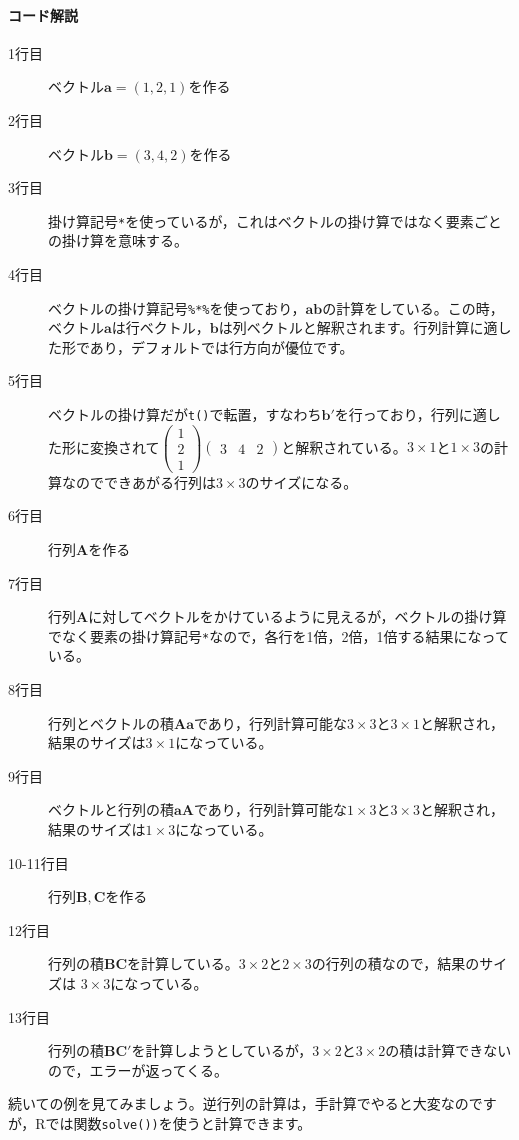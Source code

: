\documentclass{ltjsbook}
\begin{document}
\paragraph{コード解説}
\begin{description}
	\item[1行目] ベクトル$\bm{a}=(1,2,1)$を作る
	\item[2行目] ベクトル$\bm{b}=(3,4,2)$を作る
	\item[3行目] 掛け算記号\verb|*|を使っているが，これはベクトルの掛け算ではなく要素ごとの掛け算を意味する。
	\item[4行目] ベクトルの掛け算記号\verb|%*%|を使っており，$\bm{ab}$の計算をしている。この時，ベクトル$\bm{a}$は行ベクトル，$\bm{b}$は列ベクトルと解釈されます。行列計算に適した形であり，デフォルトでは行方向が優位です。
	\item[5行目] ベクトルの掛け算だが\texttt{t()}で転置，すなわち$\bm{b}'$を行っており，行列に適した形に変換されて$\begin{pmatrix}1\\2\\1\end{pmatrix}\begin{pmatrix}3&4&2\end{pmatrix}$と解釈されている。$3\times1$と$1\times3$の計算なのでできあがる行列は$3\times3$のサイズになる。
	\item[6行目] 行列$\bm{A}$を作る
	\item[7行目] 行列$\bm{A}$に対してベクトルをかけているように見えるが，ベクトルの掛け算でなく要素の掛け算記号\verb|*|なので，各行を1倍，2倍，1倍する結果になっている。
	\item[8行目] 行列とベクトルの積$\bm{Aa}$であり，行列計算可能な$3\times3$と$3\times1$と解釈され，結果のサイズは$3 \times 1$になっている。
	\item[9行目] ベクトルと行列の積$\bm{aA}$であり，行列計算可能な$1 \times 3$と$3 \times 3$と解釈され，結果のサイズは$1 \times 3$になっている。
	\item[10-11行目] 行列$\bm{B,C}$を作る
	\item[12行目] 行列の積$\bm{BC}$を計算している。$3\times2$と$2\times3$の行列の積なので，結果のサイズは $3\times3$になっている。
	\item[13行目] 行列の積$\bm{BC'}$を計算しようとしているが，$3\times2$と$3\times2$の積は計算できないので，エラーが返ってくる。
\end{description}

続いての例を見てみましょう。逆行列の計算は，手計算でやると大変なのですが，Rでは関数\texttt{solve())}を使うと計算できます。
\end{document}
